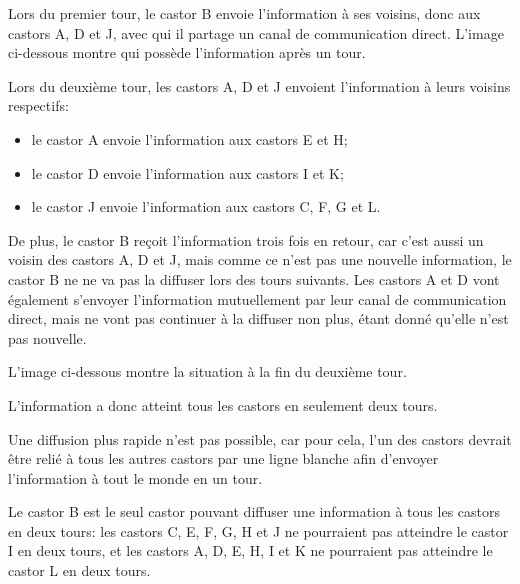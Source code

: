 {{Lors du premier tour, le castor B envoie l’information à ses voisins, donc aux castors A, D et J, avec qui il partage un canal de communication direct. L’image ci-dessous montre qui possède l’information après un tour.

{\centering%
\par}

Lors du deuxième tour, les castors A, D et J envoient l’information à leurs voisins respectifs:

\begin{itemize}
  \item le castor A envoie l’information aux castors E et H;
  \item le castor D envoie l’information aux castors I et K;
  \item le castor J envoie l’information aux castors C, F, G et L.
\end{itemize}

De plus, le castor B reçoit l’information trois fois en retour, car c’est aussi un voisin des castors A, D et J, mais comme ce n’est pas une nouvelle information, le castor B ne ne va pas la diffuser lors des tours suivants. Les castors A et D vont également s’envoyer l’information mutuellement par leur canal de communication direct, mais ne vont pas continuer à la diffuser non plus, étant donné qu’elle n’est pas nouvelle.

\begin{samepage}
L’image ci-dessous montre la situation à la fin du deuxième tour.

\nopagebreak

{\centering%
\par}
\end{samepage}

L’information a donc atteint tous les castors en seulement deux tours.

Une diffusion plus rapide n’est pas possible, car pour cela, l’un des castors devrait être relié à tous les autres castors par une ligne blanche afin d’envoyer l’information à tout le monde en un tour.

Le castor B est le seul castor pouvant diffuser une information à tous les castors en deux tours: les castors C, E, F, G, H et J ne pourraient pas atteindre le castor I en deux tours, et les castors A, D, E, H, I et K ne pourraient pas atteindre le castor L en deux tours.



}}
